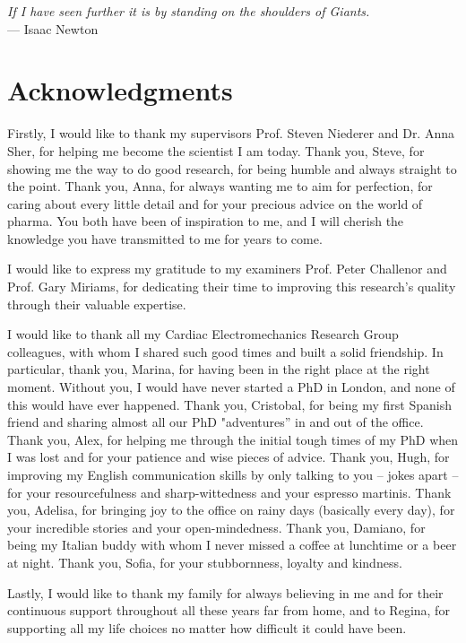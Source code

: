 
\begin{flushright}{\slshape
    If I have seen further it is by standing on the shoulders of Giants.} \\ \medskip
    --- Isaac Newton
\end{flushright}

\bigskip

\begingroup
\let\clearpage\relax
\let\cleardoublepage\relax
\let\cleardoublepage\relax
\chapter*{Acknowledgments}
Firstly, I would like to thank my supervisors Prof. Steven Niederer and Dr. Anna Sher, for helping me become the scientist I am today. Thank you, Steve, for showing me the way to do good research, for being humble and always straight to the point. Thank you, Anna, for always wanting me to aim for perfection, for caring about every little detail and for your precious advice on the world of pharma. You both have been of inspiration to me, and I will cherish the knowledge you have transmitted to me for years to come.

\vspace{0.2cm}
I would like to express my gratitude to my examiners Prof. Peter Challenor and Prof. Gary Miriams, for dedicating their time to improving this research's quality through their valuable expertise.

\vspace{0.2cm}
I would like to thank all my Cardiac Electromechanics Research Group colleagues, with whom I shared such good times and built a solid friendship. In particular, thank you, Marina, for having been in the right place at the right moment. Without you, I would have never started a PhD in London, and none of this would have ever happened. Thank you, Cristobal, for being my first Spanish friend and sharing almost all our PhD "adventures'' in and out of the office. Thank you, Alex, for helping me through the initial tough times of my PhD when I was lost and for your patience and wise pieces of advice. Thank you, Hugh, for improving my English communication skills by only talking to you -- jokes apart -- for your resourcefulness and sharp-wittedness and your espresso martinis. Thank you, Adelisa, for bringing joy to the office on rainy days (basically every day), for your incredible stories and your open-mindedness. Thank you, Damiano, for being my Italian buddy with whom I never missed a coffee at lunchtime or a beer at night. Thank you, Sofia, for your stubbornness, loyalty and kindness.

\vspace{0.2cm}
Lastly, I would like to thank my family for always believing in me and for their continuous support throughout all these years far from home, and to Regina, for supporting all my life choices no matter how difficult it could have been.

\endgroup